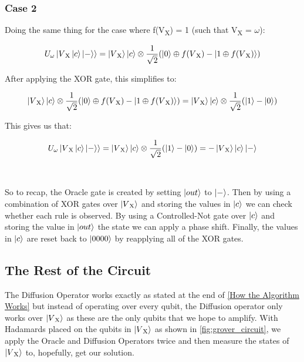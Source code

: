 \documentclass{article}
\begin{document}
\\
\subsubsection{Case 2}

Doing the same thing for the case where f(V\textsubscript{X}) = 1 (such that V\textsubscript{X} = $\omega$):

\begin{equation}
U_\omega\ket{V\textsubscript{X}\ket{c}\ket{-}} = \ket{V\textsubscript{X}}\ket{c} \otimes \frac{1}{\sqrt{2}}(\ket{0} \oplus f(V\textsubscript{X}) - \ket{1 \oplus f(V\textsubscript{X})})
\end{equation}

After applying the XOR gate, this simplifies to: 

\begin{equation}
\ket{V\textsubscript{X}}\ket{c} \otimes \frac{1}{\sqrt{2}}(\ket{0} \oplus f(V\textsubscript{X}) - \ket{1 \oplus f(V\textsubscript{X})}) = \ket{V\textsubscript{X}}\ket{c} \otimes \frac{1}{\sqrt{2}}(\ket{1} - \ket{0})
\end{equation}

This gives us that:

\begin{equation}
 U_\omega\ket{V\textsubscript{X}\ket{c}\ket{-}}= \ket{V\textsubscript{X}}\ket{c} \otimes \frac{1}{\sqrt{2}}(\ket{1} - \ket{0}) = - \ket{V\textsubscript{X}}\ket{c}\ket{-}
\end{equation}
\\
\\

So to recap, the Oracle gate is created by setting $\ket{out}$ to $\ket{-}$. Then by using a combination of XOR gates over $\ket{V\textsubscript{X}}$ and storing the values in $\ket{c}$ we can check whether each rule is observed. By using a Controlled-Not gate over $\ket{c}$ and storing the value in $\ket{out}$ the state we can apply a phase shift. Finally, the values in $\ket{c}$ are reset back to $\ket{0000}$ by reapplying all of the XOR gates.

\subsection{The Rest of the Circuit}
The Diffusion Operator works exactly as stated at the end of \ref{How the Algorithm Works} but instead of operating over every qubit, the Diffusion operator only works over $\ket{V\textsubscript{X}}$ as these are the only qubits that we hope to amplify. With Hadamards placed on the qubits in $\ket{V\textsubscript{X}}$ as shown in \ref{fig:grover_circuit}, we apply the Oracle and Diffusion Operators twice and then measure the states of $\ket{V\textsubscript{X}}$ to, hopefully, get our solution.
\end{document}
